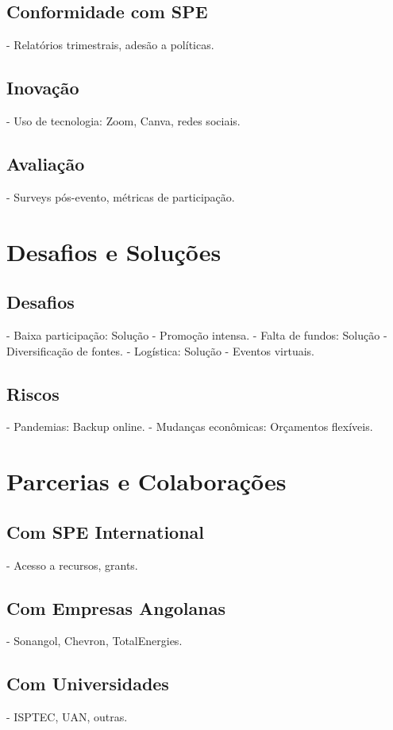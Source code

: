 \documentclass[12pt]{article}
\begin{document}
\subsection{Conformidade com SPE}
- Relatórios trimestrais, adesão a políticas.

\subsection{Inovação}
- Uso de tecnologia: Zoom, Canva, redes sociais.

\subsection{Avaliação}
- Surveys pós-evento, métricas de participação.

\section{Desafios e Soluções}

\subsection{Desafios}
- Baixa participação: Solução - Promoção intensa.
- Falta de fundos: Solução - Diversificação de fontes.
- Logística: Solução - Eventos virtuais.

\subsection{Riscos}
- Pandemias: Backup online.
- Mudanças econômicas: Orçamentos flexíveis.

\section{Parcerias e Colaborações}

\subsection{Com SPE International}
- Acesso a recursos, grants.

\subsection{Com Empresas Angolanas}
- Sonangol, Chevron, TotalEnergies.

\subsection{Com Universidades}
- ISPTEC, UAN, outras.
\end{document}
